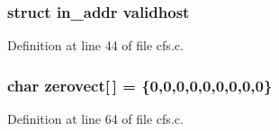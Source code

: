 \subsubsection{\setlength{\rightskip}{0pt plus 5cm}struct in\_\-addr {\bf validhost}}\label{cfs_8c_a0}




Definition at line 44 of file cfs.c.
\subsubsection{\setlength{\rightskip}{0pt plus 5cm}char {\bf zerovect}[$\,$] = \{0,0,0,0,0,0,0,0,0\}}\label{cfs_8c_a1}




Definition at line 64 of file cfs.c.